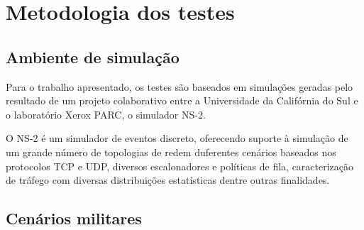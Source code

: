 \section{Metodologia dos testes} 

\subsection{Ambiente de simula\c{c}\~ ao}
Para o trabalho apresentado, os testes s\~ao baseados em simula\c{c}\~oes geradas pelo resultado de um projeto colaborativo entre a Universidade da Calif\'ornia do Sul e o laborat\'orio Xerox PARC, o simulador NS-2.

O NS-2 \'e um simulador de eventos discreto, oferecendo suporte \`a simula\c{c}\~ao de um grande n\'umero de topologias de redem duferentes cen\'arios baseados nos protocolos TCP e UDP, diversos escalonadores e pol\'iticas de fila, caracteriza\c{c}\~ao de tr\'afego com diversas distribui\c{c}\~oes estat\'isticas dentre outras finalidades.


\subsection{Cen\'arios militares}


